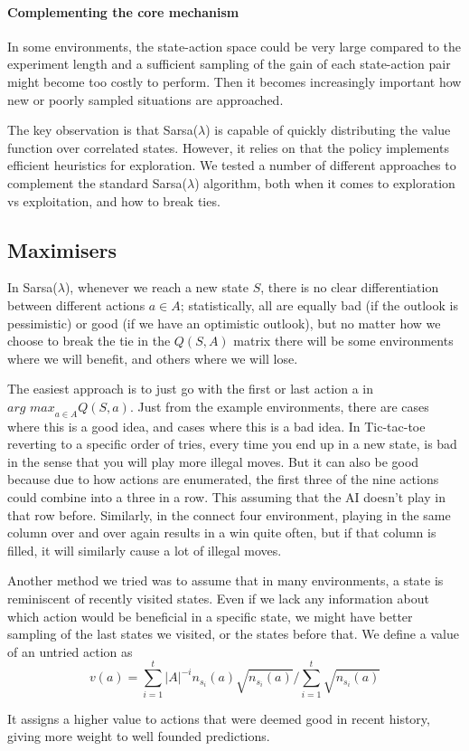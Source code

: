 \paragraph{Complementing the core mechanism}
In some environments, the state-action space could be very large compared to the
experiment length and a sufficient sampling of the gain of each state-action
pair might become too costly to perform. Then it becomes increasingly important
how new or poorly sampled situations are approached.

The key observation is that Sarsa($\lambda$) is capable of quickly distributing
the value function over correlated states. However, it relies on that the policy
implements efficient heuristics for exploration. We tested a number of different
approaches to complement the standard Sarsa($\lambda$) algorithm, both when it
comes to exploration vs exploitation, and how to break ties. 

\subsection{Maximisers}
In Sarsa($\lambda$), whenever we reach a new state $S$, there is no clear
differentiation between different actions $a \in A$; statistically, all are
equally bad (if the outlook is pessimistic) or good (if we have an optimistic
outlook), but no matter how we choose to break the tie in the $Q(S,A)$ matrix
there will be some environments where we will benefit, and others where we will
lose.

The easiest approach is to just go with the first or last action a in
$\textit{arg max}_{a \in A} Q(S,a)$. Just from the example environments, there
are cases where this is a good idea, and cases where this is a bad idea. In
Tic-tac-toe reverting to a specific order of tries, every time you end up in a
new state, is bad in the sense that you will play more illegal moves. But it can
also be good because due to how actions are enumerated, the first three of the
nine actions could combine into a three in a row. This assuming that the AI
doesn't play in that row before. Similarly, in the connect four environment,
playing in the same column over and over again results in a win quite often, but
if that column is filled, it will similarly cause a lot of illegal moves.

Another method we tried was to assume that in many environments, a state is
reminiscent of recently visited states. Even if we lack any information about
which action would be beneficial in a specific state, we might have better
sampling of the last states we visited, or the states before that. We define a
value of an untried action as
\begin{equation}
    v(a) = \sum_{i=1}^{t} \vert{A}\vert^{-i} n_{s_i}(a)
    \sqrt{n_{s_i}(a)}\Big/\sum_{i=1}^{t} \sqrt{n_{s_i}(a)}
\end{equation}

It assigns a higher value to actions that were deemed good in recent history,
giving more weight to well founded predictions.
